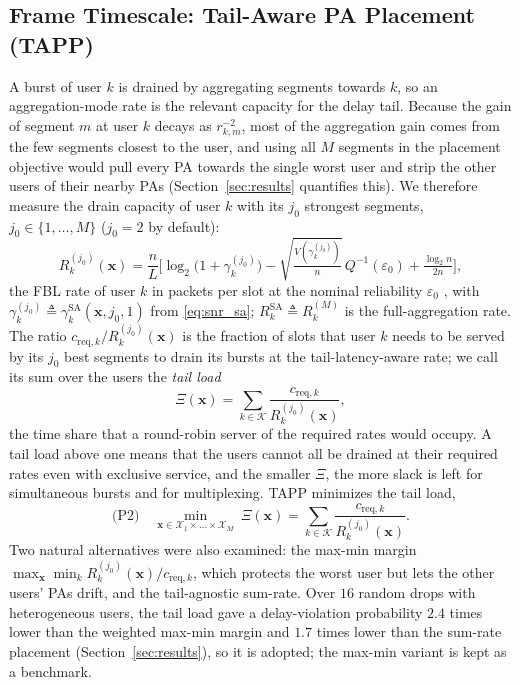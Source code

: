 \documentclass[journal]{IEEEtran}
\newcommand{\creqk}[1]{c_{\mathrm{req},#1}}
\newcommand{\vect}[1]{\bm{#1}}
\newcommand{\Kset}{\mathcal{K}}
\begin{document}
\subsection{Frame Timescale: Tail-Aware PA Placement (TAPP)}\label{sec:tapp}
A burst of user $k$ is drained by aggregating segments towards $k$, so an aggregation-mode rate is the relevant capacity for the delay tail. Because the gain of segment $m$ at user $k$ decays as $r_{k,m}^{-2}$, most of the aggregation gain comes from the few segments closest to the user, and using all $M$ segments in the placement objective would pull every PA towards the single worst user and strip the other users of their nearby PAs (Section~\ref{sec:results} quantifies this). We therefore measure the drain capacity of user $k$ with its $j_0$ strongest segments, $j_0\in\{1,\dots,M\}$ ($j_0=2$ by default):
\begin{equation}\label{eq:Rsa}
R_k^{(j_0)}(\vect x)=\frac{n}{L}\Big[\log_2\!\big(1+\gamma_k^{(j_0)}\big)-\sqrt{\tfrac{V(\gamma_k^{(j_0)})}{n}}\,Q^{-1}(\varepsilon_0)+\tfrac{\log_2 n}{2n}\Big],
\end{equation}
the FBL rate of user $k$ in packets per slot at the nominal reliability $\varepsilon_0$ \cite{Polyanskiy2010}, with $\gamma_k^{(j_0)}\triangleq\gamma_k^{\mathrm{SA}}(\vect x,j_0,1)$ from \eqref{eq:snr_sa}; $R_k^{\mathrm{SA}}\triangleq R_k^{(M)}$ is the full-aggregation rate. The ratio $\creqk{k}/R_k^{(j_0)}(\vect x)$ is the fraction of slots that user $k$ needs to be served by its $j_0$ best segments to drain its bursts at the tail-latency-aware rate; we call its sum over the users the \emph{tail load}
\begin{equation}\label{eq:load}
\Xi(\vect x)=\sum_{k\in\Kset}\frac{\creqk{k}}{R_k^{(j_0)}(\vect x)},
\end{equation}
the time share that a round-robin server of the required rates would occupy. A tail load above one means that the users cannot all be drained at their required rates even with exclusive service, and the smaller $\Xi$, the more slack is left for simultaneous bursts and for multiplexing. TAPP minimizes the tail load,
\begin{equation}\label{eq:P2}
\text{(P2)}\quad\min_{\vect x\in\mathcal X_1\times\dots\times\mathcal X_M}\ \Xi(\vect x)=\sum_{k\in\Kset}\frac{\creqk{k}}{R_k^{(j_0)}(\vect x)}.
\end{equation}
Two natural alternatives were also examined: the max-min margin $\max_{\vect x}\min_k R_k^{(j_0)}(\vect x)/\creqk{k}$, which protects the worst user but lets the other users' PAs drift, and the tail-agnostic sum-rate. Over $16$ random drops with heterogeneous users, the tail load gave a delay-violation probability $2.4$ times lower than the weighted max-min margin and $1.7$ times lower than the sum-rate placement (Section~\ref{sec:results}), so it is adopted; the max-min variant is kept as a benchmark.
\end{document}
